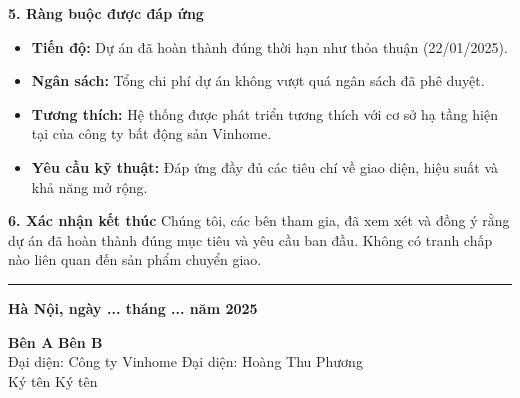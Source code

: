 {\begin{minipage}{\textwidth}
        \vspace{0.5cm}

        \noindent\textbf{5. Ràng buộc được đáp ứng}
        \begin{itemize}
            \item \textbf{Tiến độ:} Dự án đã hoàn thành đúng thời hạn như thỏa thuận (22/01/2025).
            \item \textbf{Ngân sách:} Tổng chi phí dự án không vượt quá ngân sách đã phê duyệt.
            \item \textbf{Tương thích:} Hệ thống được phát triển tương thích với cơ sở hạ tầng hiện tại của công ty bất động sản Vinhome.
            \item \textbf{Yêu cầu kỹ thuật:} Đáp ứng đầy đủ các tiêu chí về giao diện, hiệu suất và khả năng mở rộng.
        \end{itemize}

        \vspace{0.5cm}

        \noindent\textbf{6. Xác nhận kết thúc}
        Chúng tôi, các bên tham gia, đã xem xét và đồng ý rằng dự án đã hoàn thành đúng mục tiêu và yêu cầu ban đầu. Không có tranh chấp nào liên quan đến sản phẩm chuyển giao.
        \noindent\rule{\textwidth}{0.4pt}
        \begin{flushright}
            \textbf{Hà Nội, ngày ... tháng ... năm 2025} \\ \vspace{0.5cm}
        \end{flushright}
        \begin{flushleft}
            \hspace{2cm} \textbf{Bên A} \hspace{6cm} \textbf{Bên B}\\
            \hspace{1cm} Đại diện: Công ty Vinhome \hspace{3.5cm} Đại diện: Hoàng Thu Phương\\
            \hspace{2cm} Ký tên          \hspace{6cm} Ký tên\\ \vspace{1cm}
        \end{flushleft}
	\end{minipage}
}        


